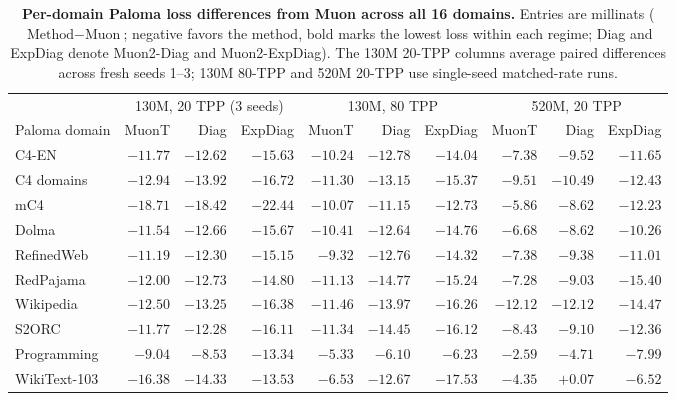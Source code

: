 \begin{table}[tbp]\centering\footnotesize
\setlength{\tabcolsep}{4.2pt}
\caption{\textbf{Per-domain Paloma loss differences from Muon across all 16 domains.} Entries are millinats ($\text{Method}-\text{Muon}$; negative favors the method, bold marks the lowest loss within each regime; Diag and ExpDiag denote Muon2-Diag and Muon2-ExpDiag). The 130M 20-TPP columns average paired differences across fresh seeds 1--3; 130M 80-TPP and 520M 20-TPP use single-seed matched-rate runs.}\label{tab:paloma_full}
\begin{tabularx}{\textwidth}{@{}>{\raggedright\arraybackslash}Xrrrrrrrrr@{}}
\toprule
& \multicolumn{3}{c}{130M, 20 TPP (3 seeds)} & \multicolumn{3}{c}{130M, 80 TPP} & \multicolumn{3}{c}{520M, 20 TPP} \\
\cmidrule(lr){2-4}\cmidrule(lr){5-7}\cmidrule(lr){8-10}
Paloma domain & MuonT & Diag & ExpDiag & MuonT & Diag & ExpDiag & MuonT & Diag & ExpDiag \\
\midrule
C4-EN & $-11.77$ & $-12.62$ & $\mathbf{-15.63}$ & $-10.24$ & $-12.78$ & $\mathbf{-14.04}$ & $-7.38$ & $-9.52$ & $\mathbf{-11.65}$ \\
C4 domains & $-12.94$ & $-13.92$ & $\mathbf{-16.72}$ & $-11.30$ & $-13.15$ & $\mathbf{-15.37}$ & $-9.51$ & $-10.49$ & $\mathbf{-12.43}$ \\
mC4 & $-18.71$ & $-18.42$ & $\mathbf{-22.44}$ & $-10.07$ & $-11.15$ & $\mathbf{-12.73}$ & $-5.86$ & $-8.62$ & $\mathbf{-12.23}$ \\
Dolma & $-11.54$ & $-12.66$ & $\mathbf{-15.67}$ & $-10.41$ & $-12.64$ & $\mathbf{-14.76}$ & $-6.68$ & $-8.62$ & $\mathbf{-10.26}$ \\
RefinedWeb & $-11.19$ & $-12.30$ & $\mathbf{-15.15}$ & $-9.32$ & $-12.76$ & $\mathbf{-14.32}$ & $-7.38$ & $-9.38$ & $\mathbf{-11.01}$ \\
RedPajama & $-12.00$ & $-12.73$ & $\mathbf{-14.80}$ & $-11.13$ & $-14.77$ & $\mathbf{-15.24}$ & $-7.28$ & $-9.03$ & $\mathbf{-15.40}$ \\
Wikipedia & $-12.50$ & $-13.25$ & $\mathbf{-16.38}$ & $-11.46$ & $-13.97$ & $\mathbf{-16.26}$ & $-12.12$ & $-12.12$ & $\mathbf{-14.47}$ \\
S2ORC & $-11.77$ & $-12.28$ & $\mathbf{-16.11}$ & $-11.34$ & $-14.45$ & $\mathbf{-16.12}$ & $-8.43$ & $-9.10$ & $\mathbf{-12.36}$ \\
Programming & $-9.04$ & $-8.53$ & $\mathbf{-13.34}$ & $-5.33$ & $-6.10$ & $\mathbf{-6.23}$ & $-2.59$ & $-4.71$ & $\mathbf{-7.99}$ \\
WikiText-103 & $\mathbf{-16.38}$ & $-14.33$ & $-13.53$ & $-6.53$ & $-12.67$ & $\mathbf{-17.53}$ & $-4.35$ & $+0.07$ & $\mathbf{-6.52}$ \\

\end{tabularx}
\end{table}
